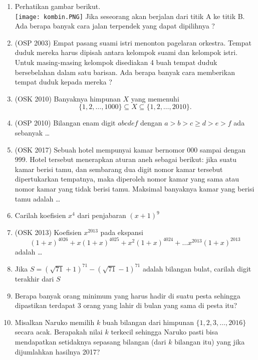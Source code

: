 \documentclass[11pt]{scrartcl}
\begin{document}
\begin{enumerate}
    \item Perhatikan gambar berikut.\\
    \texttt{[image: kombin.PNG]}
    Jika seseorang akan berjalan dari titik A ke titik B. Ada berapa banyak cara jalan terpendek 
yang dapat dipilihnya ?
    
    \item (OSP 2003) Empat pasang suami istri menonton pagelaran orkestra. Tempat duduk mereka harus 
dipisah antara kelompok suami dan kelompok istri. Untuk masing-masing kelompok disediakan 4
buah tempat duduk bersebelahan dalam satu barisan. Ada berapa banyak cara memberikan 
tempat duduk kepada mereka ?

    \item (OSK 2010) Banyaknya himpunan $X$ yang memenuhi 
$$\{1,2,\dots,1000\} \subseteq X \subseteq \{1,2,\dots,2010\}.$$

    \item (OSP 2010) Bilangan enam digit $abcdef$ dengan $a > b > c \ge d > e > f$ ada sebanyak \dots
    
    \item (OSK 2017)
	Sebuah hotel mempunyai kamar bernomor 000 sampai dengan 999. Hotel tersebut menerapkan
aturan aneh sebagai berikut: jika suatu kamar berisi tamu, dan sembarang dua digit nomor kamar
tersebut dipertukarkan tempatnya, maka diperoleh nomor kamar yang sama atau nomor kamar
yang tidak berisi tamu. Maksimal banyaknya kamar yang berisi tamu adalah \dots

    \item Carilah koefisien $x^4$ dari penjabaran $(x+1)^9$
    
    \item (OSK 2013) Koefisien $x^{2013}$ pada ekspansi
    $$(1+x)^{4026}+x(1+x)^{4025}+x^2(1+x)^{4024}+\dots x^{2013}(1+x)^{2013}$$
    adalah \dots
    
    \item Jika $S=(\sqrt{71}+1)^{71}-(\sqrt{71}-1)^{71}$ adalah bilangan bulat, carilah digit terakhir dari $S$
    \item Berapa banyak orang minimum yang harus hadir di suatu pesta sehingga dipastikan terdapat 3 orang yang lahir di bulan yang sama di pesta itu?
    
    \item Misalkan Naruko memilih $k$ buah bilangan dari himpunan $\{1,2,3,\dots,2016\}$ secara acak. Berapakah nilai $k$ terkecil sehingga Naruko pasti bisa mendapatkan setidaknya sepasang bilangan (dari $k$ bilangan itu) yang jika dijumlahkan hasilnya 2017?
    

\end{enumerate}
\end{document}
